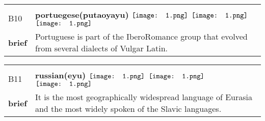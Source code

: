 \documentclass[UTF8]{article}
\begin{document}
            \begin{tabularx}{\textwidth}{p{1.5cm}X}
            \arrayrulecolor{myBlue}
        	\hline\\
            \small{B10}&
            \large{\bfseries{portuegese(putaoyayu)}}\hfill
                                                            $\vcenter{\hbox{\texttt{[image: 1.png]}}}$
                                                                \phantom{$\vcenter{\hbox{\texttt{[image: 1.png]}}}$}
                                                                $\vcenter{\hbox{\texttt{[image: 1.png]}}}$
                                                                \phantom{$\vcenter{\hbox{\texttt{[image: 1.png]}}}$}
                                                                \phantom{$\vcenter{\hbox{\texttt{[image: 1.png]}}}$}
                                                                $\vcenter{\hbox{\texttt{[image: 1.png]}}}$
                                                                \phantom{$\vcenter{\hbox{\texttt{[image: 1.png]}}}$}
                                        \\[10pt]
            \large{\bfseries{brief}}&\noindent\parbox[c]{\hsize}{Portuguese is part of the IberoRomance group that evolved from several dialects of Vulgar Latin.} \\[5pt]
            \hline\\[-10pt]
        \end{tabularx}
            \begin{tabularx}{\textwidth}{p{1.5cm}X}
            \arrayrulecolor{myBlue}
        	\hline\\
            \small{B11}&
            \large{\bfseries{russian(eyu)}}\hfill
                                                            $\vcenter{\hbox{\texttt{[image: 1.png]}}}$
                                                                \phantom{$\vcenter{\hbox{\texttt{[image: 1.png]}}}$}
                                                                $\vcenter{\hbox{\texttt{[image: 1.png]}}}$
                                                                \phantom{$\vcenter{\hbox{\texttt{[image: 1.png]}}}$}
                                                                \phantom{$\vcenter{\hbox{\texttt{[image: 1.png]}}}$}
                                                                $\vcenter{\hbox{\texttt{[image: 1.png]}}}$
                                                                \phantom{$\vcenter{\hbox{\texttt{[image: 1.png]}}}$}
                                        \\[10pt]
            \large{\bfseries{brief}}&\noindent\parbox[c]{\hsize}{It is the most geographically widespread language of Eurasia and the most widely spoken of the Slavic languages. } \\[5pt]
            \hline\\[-10pt]
        \end{tabularx}
\end{document}
